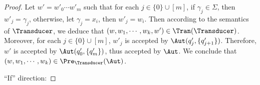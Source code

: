 \begin{proof}
Let $w' = w'_0 \cdots w'_m$ such that for each $j \in \{0\} \cup [m]$, if  $\gamma_j \in \Sigma$, then $w'_j = \gamma_j$, otherwise, let $\gamma_j = x_i$, then $w'_j = w_i$. Then according to the semantics of $\Transducer$, we deduce that $(w, w_1, \cdots, w_k, w') \in \Tran(\Transducer)$.
Moreover, for each $j \in \{0\} \cup [m]$, $w'_j$ is accepted by $\Aut(q'_j, \{q'_{j+1}\})$. Therefore, $w'$ is accepted by $\Aut(q'_0, \{q'_m\})$, thus accepted by $\Aut$. We conclude that $(w, w_1,\cdots, w_k) \in \Pre_\Transducer(\Aut)$.

\smallskip


\noindent ``If'' direction: 
\end{proof}